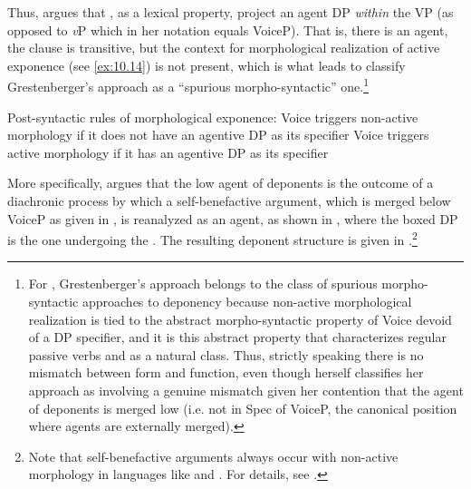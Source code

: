 \documentclass[output=paper]{langsci/langscibook}
\begin{document}
Thus, \citeauthor{Grestenberger2014} argues that , as a lexical property, project
an agent DP \emph{within} the VP (as opposed to \emph{v}P which in her notation
equals VoiceP). That is, there is an agent, the clause is transitive, but the
context for morphological realization of active exponence (see \eqref{ex:10.14})
is not present, which is what leads \citet{Muller2016b} to classify
Grestenberger’s approach as a “spurious morpho-syntactic” one.\footnote{For
    \citet{Muller2016b}, Grestenberger’s approach belongs to the class of
    spurious morpho-syntactic approaches to deponency because non-active
    morphological realization is tied to the abstract morpho-syntactic property
    of Voice devoid of a DP specifier, and it is this abstract property that
    characterizes regular passive verbs and  as a natural class.
    Thus, strictly speaking there is no mismatch between form and function,
    even though \citeauthor{Grestenberger2014} herself classifies her approach as involving a
    genuine mismatch given her contention that the agent of deponents is merged
low (i.e. not in Spec of VoiceP, the canonical position where agents are
externally merged).}

\ea%
    \label{ex:10.14} Post-syntactic rules of morphological exponence:
    \ea Voice triggers non-active morphology if it does not have an agentive DP
        as its specifier
    \ex Voice triggers active morphology if it has an agentive DP as its
        specifier
    \z
\z

More specifically, \citeauthor{Grestenberger2014} argues that the low agent of deponents is the
outcome of a diachronic  process by which a self-benefactive
argument, which is merged below VoiceP as given in , is
reanalyzed as an agent, as shown in , where the boxed DP is the
one undergoing the . The resulting deponent structure is given in
.\footnote{Note that self-benefactive arguments always occur
with non-active morphology in languages like  and . For details, see
\textcite{Grestenberger2014,Grestenberger2018a}.}
\end{document}
